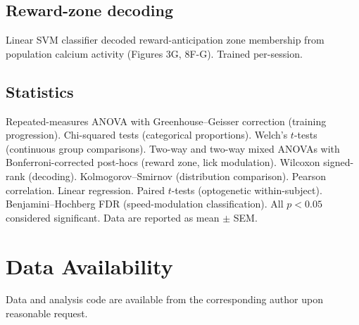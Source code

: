 \documentclass[11pt]{article}
\begin{document}
\subsection{Reward-zone decoding}
Linear SVM classifier decoded reward-anticipation zone membership from population calcium activity (Figures 3G, 8F-G). Trained per-session.

\subsection{Statistics}
Repeated-measures ANOVA with Greenhouse--Geisser correction (training progression). Chi-squared tests (categorical proportions). Welch's $t$-tests (continuous group comparisons). Two-way and two-way mixed ANOVAs with Bonferroni-corrected post-hocs (reward zone, lick modulation). Wilcoxon signed-rank (decoding). Kolmogorov--Smirnov (distribution comparison). Pearson correlation. Linear regression. Paired $t$-tests (optogenetic within-subject). Benjamini--Hochberg FDR (speed-modulation classification). All $p<0.05$ considered significant. Data are reported as mean $\pm$ SEM.

\section{Data Availability}
Data and analysis code are available from the corresponding author upon reasonable request.



\end{document}
